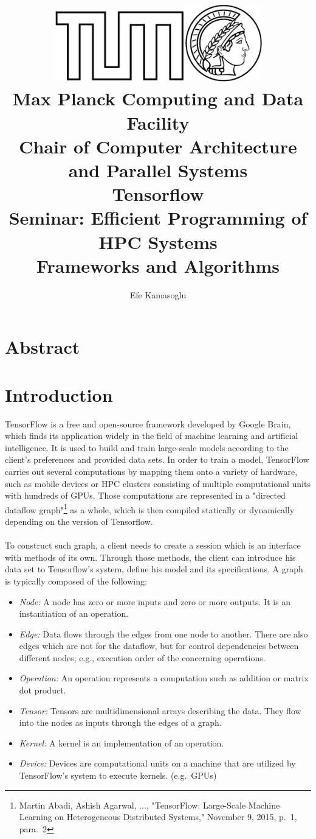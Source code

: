 \documentclass[ieeetran]{article}
\title{\includegraphics[width=0.43\textwidth]{tumlogo}\hspace{2ex}\includegraphics[width=0.25\textwidth]{maxlogo}\vspace{1ex}\\ \large \textbf{Max Planck Computing and Data Facility \\Chair of Computer Architecture and Parallel Systems} \vspace{10ex}\\ \huge Tensorflow \vspace{2ex}\\
\large Seminar: Efficient Programming of HPC Systems \\Frameworks and Algorithms\vspace{15ex}}
\author{Efe Kamasoglu}
\begin{document}
\maketitle

\pagebreak

\tableofcontents

\pagebreak

\section*{Abstract}



\pagebreak


\section{Introduction} %
\label{sec:introduction}
TensorFlow is a free and open-source framework developed by Google Brain, which finds its application widely in the field of machine learning and artificial intelligence. It is used to build and train large-scale models according to the client's preferences and provided data sets. In order to train a model, TensorFlow carries out several computations by mapping them onto a variety of hardware, such as mobile devices or HPC clusters consisting of multiple computational units with hundreds of GPUs. Those computations are represented in a "directed dataflow graph"\footnote{Martin Abadi, Ashish Agarwal, ..., "TensorFlow: Large-Scale Machine Learning on Heterogeneous Distributed Systems," November 9, 2015, p.\ 1, para.\ 2} as a whole, which is then compiled statically or dynamically depending on the version of Tensorflow. 
\\ \\To construct such graph, a client needs to create a session which is an interface with methods of its own. Through those methods, the client can introduce his data set to Tensorflow's system, define his model and its specifications. A graph is typically composed of the following:
\begin{itemize}
  \item \textit{Node:} A node has zero or more inputs and zero or more outputs. It is an instantiation of an operation.
\item \textit{Edge:} Data flows through the edges from one node to another. There are also edges which are not for the dataflow, but for control dependencies between different nodes; e.g., execution order of the concerning operations.
\item \textit{Operation:} An operation represents a computation such as addition or matrix dot product.
\item \textit{Tensor:} Tensors are multidimensional arrays describing the data. They flow into the nodes as inputs through the edges of a graph.
\item \textit{Kernel:} A kernel is an implementation of an operation.
\item \textit{Device:} Devices are computational units on a machine that are utilized by TensorFlow's system to execute kernels. (e.g.\ GPUs)
\end{itemize}
\end{document}
